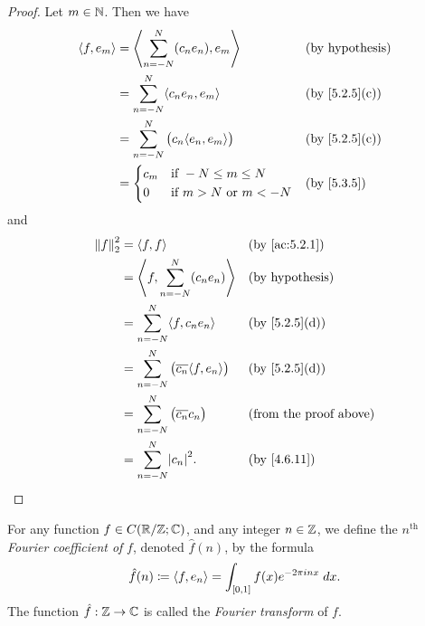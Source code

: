 \begin{proof}
  Let \(m \in \N\).
  Then we have
  \begin{align*}
    \inner*{f, e_m} & = \inner*{\sum_{n = -N}^N (c_n e_n), e_m}         &  & \text{(by hypothesis)}      \\
                    & = \sum_{n = -N}^N \inner*{c_n e_n, e_m}           &  & \text{(by \cref{5.2.5}(c))} \\
                    & = \sum_{n = -N}^N \big(c_n \inner*{e_n, e_m}\big) &  & \text{(by \cref{5.2.5}(c))} \\
                    & = \begin{dcases}
                          c_m & \text{if } -N \leq m \leq N         \\
                          0   & \text{if } m > N \text{ or } m < -N
                        \end{dcases}      &  & \by{5.3.5}
  \end{align*}
  and
  \begin{align*}
    \norm*{f}_2^2 & = \inner*{f, f}                                            &  & \text{(by \cref{ac:5.2.1})}   \\
                  & = \inner*{f, \sum_{n = -N}^N (c_n e_n)}                    &  & \text{(by hypothesis)}        \\
                  & = \sum_{n = -N}^N \inner*{f, c_n e_n}                      &  & \text{(by \cref{5.2.5}(d))}   \\
                  & = \sum_{n = -N}^N \big(\overline{c_n} \inner*{f, e_n}\big) &  & \text{(by \cref{5.2.5}(d))}   \\
                  & = \sum_{n = -N}^N \big(\overline{c_n} c_n\big)             &  & \text{(from the proof above)} \\
                  & = \sum_{n = -N}^N \abs{c_n}^2.                             &  & \text{(by \cref{4.6.11})}
  \end{align*}
\end{proof}

\begin{defn}\label{5.3.7}
  For any function \(f \in C(\R / \Z ; \C)\), and any integer \(n \in \Z\), we define the \(n^{\text{th}}\) \emph{Fourier coefficient of} \(f\), denoted \(\hat{f}(n)\), by the formula
  \[
    \hat{f}(n) \coloneqq \inner*{f, e_n} = \int_{[0, 1]} f(x) e^{- 2 \pi i n x} \; dx.
  \]
  The function \(\hat{f} : \Z \to \C\) is called the \emph{Fourier transform} of \(f\).
\end{defn}

